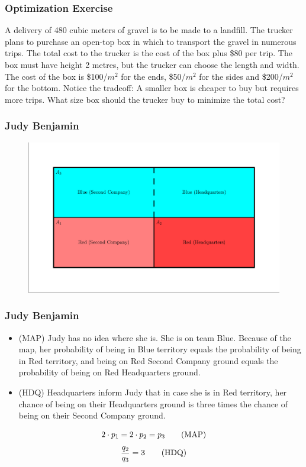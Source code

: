 \documentclass[xcolor=dvipsnames]{beamer}
\begin{document}
\begin{frame}
  \frametitle{Optimization Exercise}
  {\ubung} A delivery of 480 cubic meters of gravel is to be made
  to a landfill. The trucker plans to purchase an open-top box in
  which to transport the gravel in numerous trips. The total cost
  to the trucker is the cost of the box plus \$80 per trip. The
  box must have height 2 metres, but the trucker can choose the
  length and width. The cost of the box is \$100/$m^{2}$ for the
  ends, \$50/$m^{2}$ for the sides and \$200/$m^{2}$ for the
  bottom. Notice the tradeoff: A smaller box is cheaper to buy but
  requires more trips. What size box should the trucker buy to
  minimize the total cost?
\end{frame}

\begin{frame}
  \frametitle{Judy Benjamin}
  \begin{figure}[h]
    \includegraphics[scale=0.5]{./diagrams/judy.eps}
  \end{figure}
\end{frame}

\begin{frame}
  \frametitle{Judy Benjamin}
\begin{itemize}
\item (MAP) Judy has no idea where she is. She is on team Blue.
  Because of the map, her probability of being in Blue territory
  equals the probability of being in Red territory, and being on Red
  Second Company ground equals the probability of being on Red
  Headquarters ground.
\item (HDQ) Headquarters inform Judy that in case she is in Red
  territory, her chance of being on their Headquarters ground is three
  times the chance of being on their Second Company ground.
\end{itemize}
\begin{equation}
  \label{eq:map}
  2\cdot{}p_{1}=2\cdot{}p_{2}=p_{3}\tag{\mbox{MAP}}
\end{equation}
\begin{equation}
  \label{eq:hdq}
  \frac{q_{2}}{q_{3}}=3\tag{\mbox{HDQ}}
\end{equation}
\end{frame}
\end{document}
